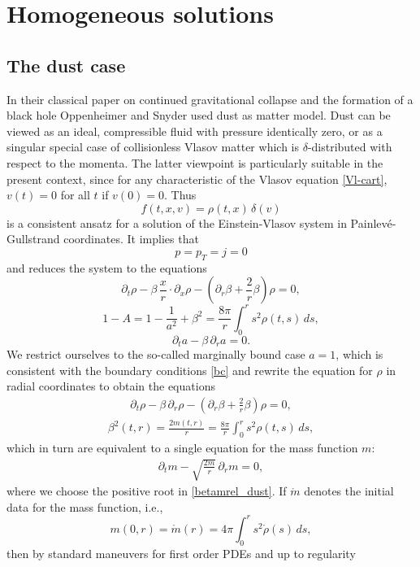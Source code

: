 \documentclass[11pt]{article}
\begin{document}
\section{Homogeneous solutions} \label{sec_hom}
\setcounter{equation}{0}
%
%
\subsection{The dust case} \label{subsec_homdust}
%
%
In their classical paper \cite{OS} on continued gravitational collapse
and the formation of a black hole {\sc Oppenheimer} and {\sc Snyder}
used dust as matter model. Dust can be viewed as an ideal, compressible
fluid with pressure identically zero, or as a singular special case
of collisionless Vlasov matter which is $\delta$-distributed with respect to
the momenta. The latter viewpoint is particularly suitable in the present
context, since for any characteristic of the Vlasov equation
\eqref{Vl-cart}, $v(t)=0$ for all $t$ if $v(0)=0$. Thus
\[
f(t,x,v)=\rho(t,x)\, \delta(v)
\]
is a consistent ansatz for a solution of the Einstein-Vlasov system
in Painlev\'{e}-Gullstrand coordinates. It implies that
\[
p = p_T = j = 0
\]
and reduces the system to the equations
\[
\partial_t \rho - \beta\, \frac{x}{r} \cdot \partial_x \rho -
\left(\partial_r \beta + \frac{2}{r} \beta\right) \rho = 0,
\]
\[
1- A = 1 - \frac{1}{a^2} + \beta^2
= \frac{8\pi}{r} \int_0^r s^2 \rho(t,s)\, ds,
\]
\[
\partial_t a - \beta\, \partial_r a = 0.
\]
We restrict ourselves to the so-called marginally bound
case $a=1$, which is consistent with the
boundary conditions \eqref{bc} and rewrite the equation for $\rho$
in radial coordinates to obtain the equations
\begin{align}\label{rhoeq_dust}
\partial_t \rho - \beta\, \partial_r \rho -
\left(\partial_r \beta + \frac{2}{r} \beta\right) \rho = 0,
\end{align}
\begin{align}\label{betamrel_dust}
\beta^2(t,r)
= \frac{2 m(t,r)}{r} = \frac{8\pi}{r} \int_0^r s^2 \rho(t,s)\, ds,
\end{align}
which in turn are equivalent to a single equation for the mass
function $m$:
\begin{align}\label{meq_dust}
\partial_t m - \sqrt{\frac{2 m}{r}}\, \partial_r m = 0,
\end{align}
where we choose the positive root in \eqref{betamrel_dust}.
If $\mathring{m}$ denotes the initial data for the mass function, i.e.,
\[
m(0,r) = \mathring{m}(r) = 4\pi \int_0^r s^2 \mathring{\rho}(s)\, ds,
\]
then by standard maneuvers for first order PDEs and up to regularity
\end{document}
